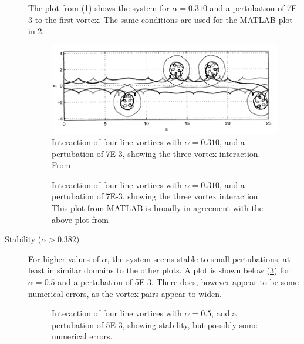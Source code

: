 \documentclass[10pt, a4paper]{article}
\numberwithin{equation}{section}
\begin{document}
\begin{description}
The plot from \citet{acheson00} (\cref{fig:ach3inst}) shows the system for $\alpha=0.310$ and a pertubation of \num{7E-3} to the first vortex.
The same conditions are used for the MATLAB plot in \cref{fig:3instab}.
\begin{figure}[ht]
\centering
\includegraphics[width=\textwidth]{ach3inst.png}
\caption{Interaction of four line vortices with $\alpha=0.310$, and a pertubation of \num{7E-3}, showing the three vortex interaction. From \citet[p.~272]{acheson00}}
\label{fig:ach3inst}
\end{figure}
\begin{figure}[ht]
\centering
\setlength\figureheight{7.5cm} 
\setlength\figurewidth{\textwidth}

\caption{Interaction of four line vortices with $\alpha=0.310$, and a pertubation of \num{7E-3},  showing the three vortex interaction. This plot from MATLAB is broadly in agreement with the above plot from \citet{acheson00}}
\label{fig:3instab}
\end{figure}
\item[Stability ($\alpha>0.382$)] 
For higher values of $\alpha$, the system seems stable to small pertubations, at least in similar domains to the other plots.
A plot is shown below (\cref{fig:stable}) for $\alpha=0.5$ and a pertubation of \num{5E-3}.
There does, however appear to be some numerical errors, as the vortex pairs appear to widen.
\begin{figure}[ht]
\centering
\setlength\figureheight{7.5cm} 
\setlength\figurewidth{\textwidth}

\caption{Interaction of four line vortices with $\alpha=0.5$, and a pertubation of \num{5E-3},  showing stability, but possibly some numerical errors.}
\label{fig:stable}
\end{figure}
\end{description}
\clearpage
\end{document}
